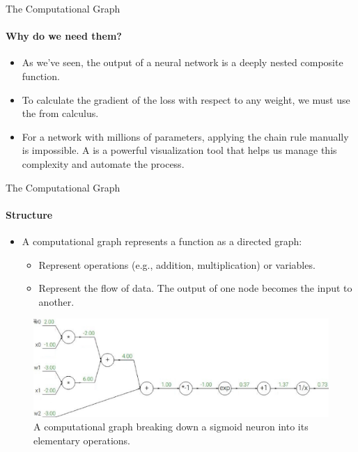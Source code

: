 \begin{frame}{The Computational Graph}
    \framesubtitle{Why do we need them?}
    \begin{itemize}
        \item As we've seen, the output of a neural network is a deeply nested composite function.
        \item To calculate the gradient of the loss with respect to any weight, we must use the  from calculus.
        \item For a network with millions of parameters, applying the chain rule manually is impossible. A  is a powerful visualization tool that helps us manage this complexity and automate the process.
    \end{itemize}
\end{frame}

\begin{frame}{The Computational Graph}
    \framesubtitle{Structure}
    \begin{itemize}
        \item A computational graph represents a function as a directed graph:
        \begin{itemize}
            \item {} Represent operations (e.g., addition, multiplication) or variables.
            \item {} Represent the flow of data. The output of one node becomes the input to another.
        \end{itemize}
    \end{itemize}
    \begin{figure}
        \centering
        \includegraphics[width=0.9\linewidth]{images/computational_graph_sigmoid_forward.png}
        \caption{A computational graph breaking down a sigmoid neuron into its elementary operations.}
    \end{figure}
\end{frame}

